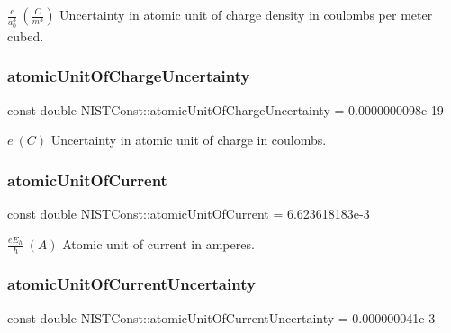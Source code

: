 $\frac{e}{a_0^3} \ (\frac{C}{m^3})$ Uncertainty in atomic unit of charge density in coulombs per meter cubed. \mbox{\label{group___n_i_s_t_const-_atomic_unit_ga681051e6abc6de4aaa406fd9e6904730}} 
\subsubsection{\texorpdfstring{atomic\+Unit\+Of\+Charge\+Uncertainty}{atomicUnitOfChargeUncertainty}}
{\footnotesize\ttfamily const double N\+I\+S\+T\+Const\+::atomic\+Unit\+Of\+Charge\+Uncertainty = 0.\+0000000098e-\/19}

$e \ (C)$ Uncertainty in atomic unit of charge in coulombs. \mbox{\label{group___n_i_s_t_const-_atomic_unit_ga6d0f3cfc8aaa2aeb120559aaea2dc5c6}} 
\subsubsection{\texorpdfstring{atomic\+Unit\+Of\+Current}{atomicUnitOfCurrent}}
{\footnotesize\ttfamily const double N\+I\+S\+T\+Const\+::atomic\+Unit\+Of\+Current = 6.\+623618183e-\/3}

$\frac{e E_h}{\hbar} \ (A)$ Atomic unit of current in amperes. \mbox{\label{group___n_i_s_t_const-_atomic_unit_gaef0b7cef2d2f63889e17b26d37173d3d}} 
\subsubsection{\texorpdfstring{atomic\+Unit\+Of\+Current\+Uncertainty}{atomicUnitOfCurrentUncertainty}}
{\footnotesize\ttfamily const double N\+I\+S\+T\+Const\+::atomic\+Unit\+Of\+Current\+Uncertainty = 0.\+000000041e-\/3}

